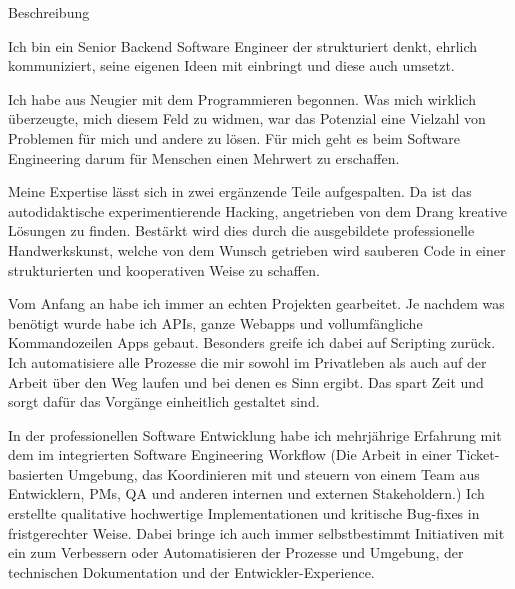 \documentclass{cv}
\begin{document}
\begin{rSection}{Beschreibung}

  \newcommand\skillWidth{0.48}
  \begin{minipage}[t]{\skillWidth\linewidth}

    Ich bin ein Senior Backend Software Engineer der strukturiert denkt, ehrlich kommuniziert, seine eigenen Ideen mit einbringt und diese auch umsetzt.

    \medskip

    Ich habe aus Neugier mit dem Programmieren begonnen.
    Was mich wirklich überzeugte, mich diesem Feld zu widmen, war das Potenzial eine Vielzahl von Problemen für mich und andere zu lösen.
    Für mich geht es beim Software Engineering darum für Menschen einen Mehrwert zu erschaffen.

    \medskip

    Meine Expertise lässt sich in zwei ergänzende Teile aufgespalten.
    Da ist das autodidaktische experimentierende Hacking, angetrieben von dem
    Drang kreative Lösungen zu finden.
    Bestärkt wird dies durch die ausgebildete professionelle Handwerkskunst,
    welche von dem Wunsch getrieben wird sauberen Code in einer strukturierten
    und kooperativen Weise zu schaffen.

    \medskip

    Vom Anfang an habe ich immer an echten Projekten gearbeitet.
    Je nachdem was benötigt wurde habe ich APIs, ganze Webapps und vollumfängliche Kommandozeilen Apps gebaut.
    Besonders greife ich dabei auf Scripting zurück.
    Ich automatisiere alle Prozesse die mir sowohl im Privatleben als auch auf
    der Arbeit über den Weg laufen und bei denen es Sinn ergibt.
    Das spart Zeit und sorgt dafür das Vorgänge einheitlich gestaltet sind.

  \end{minipage}
  \hfill
  \begin{minipage}[t]{\skillWidth\linewidth}

    In der professionellen Software Entwicklung habe ich mehrjährige Erfahrung mit dem im integrierten
    Software Engineering Workflow (Die Arbeit in einer Ticket-basierten
    Umgebung, das Koordinieren mit und steuern von einem Team aus Entwicklern, PMs, QA und anderen
    internen und externen Stakeholdern.)
    Ich erstellte qualitative hochwertige Implementationen und kritische Bug-fixes in fristgerechter Weise.
    Dabei bringe ich auch immer selbstbestimmt Initiativen mit ein zum Verbessern oder Automatisieren der Prozesse und Umgebung, der technischen Dokumentation und der Entwickler-Experience.


\end{minipage}
\end{rSection}
\end{document}
